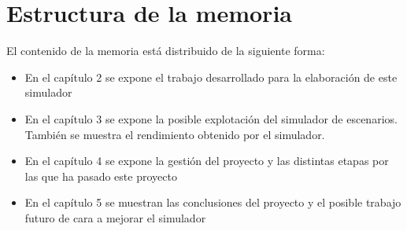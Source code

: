 \section{Estructura de la memoria}

El contenido de la memoria está distribuido de la siguiente forma:

\begin{itemize}
       \item En el capítulo 2 se expone el trabajo desarrollado para la elaboración de este simulador
       \item En el capítulo 3 se expone la posible explotación del simulador de escenarios. También se muestra el rendimiento obtenido por el simulador.
       \item En el capítulo 4 se expone la gestión del proyecto y las distintas etapas por las que ha pasado este proyecto
       \item En el capítulo 5 se muestran las conclusiones del proyecto y el posible trabajo futuro de cara a mejorar el simulador 
\end{itemize}